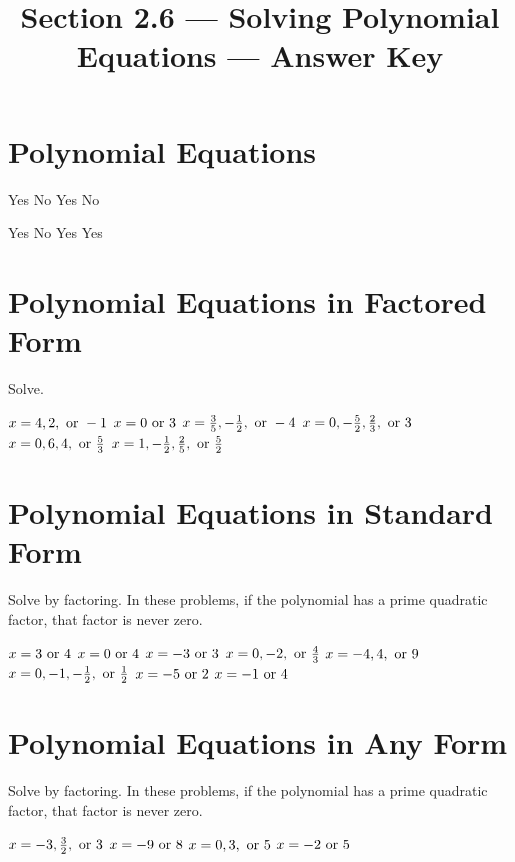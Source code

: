

\title{Section 2.6 --- Solving Polynomial Equations --- Answer Key}


\maketitle
\section*{Polynomial Equations}
\begin{senum}
\item \begin{nmenum}
\mitemxxxx
{Yes}
{No}
{Yes}
{No}
\end{nmenum}
\item \begin{nmenum}
\mitemxxxx
{Yes}
{No}
{Yes}
{Yes}
\end{nmenum}
\end{senum}

\section*{Polynomial Equations in Factored Form}
Solve.
\begin{smenum}
\mitemxx
{$x=4,2,\mbox{ or } -1$}
{$x=0\mbox{ or } 3$}
\mitemxx
{$x=\frac{3}{5},-\frac{1}{2},\mbox{ or } -4$}
{$x=0,-\frac{5}{2},\frac{2}{3},\mbox{ or } 3$}
\mitemxx
{$x=0,6,4,\mbox{ or }\frac{5}{3}$}
{$x=1,-\frac{1}{2},\frac{2}{5},\mbox{ or }\frac{5}{2}$}
\end{smenum}

\section*{Polynomial Equations in Standard Form}
Solve by factoring. In these problems, if the polynomial has a prime quadratic factor, that factor is never zero.
\begin{smenum}
\mitemxx
{$x=3\mbox{ or } 4$}
{$x=0\mbox{ or } 4$}
\mitemxx
{$x=-3\mbox{ or } 3$}
{$x=0,-2,\mbox{ or }\frac{4}{3}$}
\mitemxx
{$x=-4,4,\mbox{ or } 9$}
{$x=0,-1,-\frac{1}{2},\mbox{ or }\frac{1}{2}$}
\mitemxx
{$x=-5\mbox{ or } 2$}
{$x=-1\mbox{ or } 4$}
\end{smenum}

\section*{Polynomial Equations in Any Form}
Solve by factoring. In these problems, if the polynomial has a prime quadratic factor, that factor is never zero.
\begin{smenum}
\mitemxx
{$x=-3,\frac{3}{2},\mbox{ or } 3$}
{$x=-9\mbox{ or } 8$}
\mitemxx
{$x=0,3,\mbox{ or } 5$}
{$x=-2\mbox{ or } 5$}
\end{smenum}

